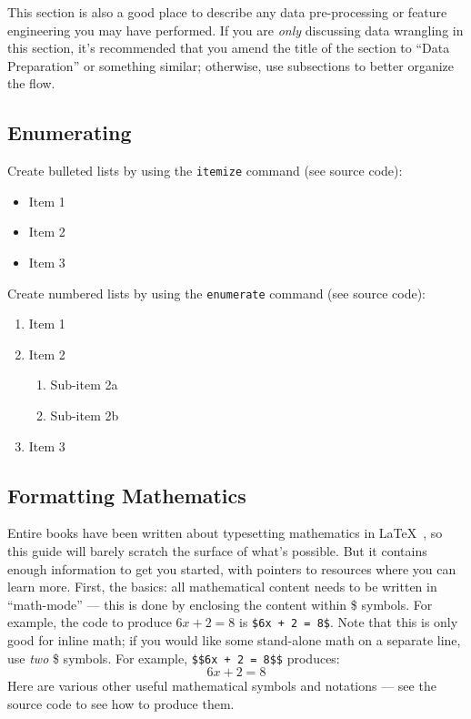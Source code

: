 This section is also a good place to describe any data pre-processing
or feature engineering you may have performed. If you are \emph{only}
discussing data wrangling in this section, it's recommended that you
amend the title of the section to ``Data Preparation'' or something
similar; otherwise, use subsections to better organize the flow.

\subsection{Enumerating}
\label{subsec:enum}

Create bulleted lists by using the \texttt{itemize} command (see source code):
\begin{itemize}
  \item Item 1
  \item Item 2
  \item Item 3
\end{itemize}
Create numbered lists by using the \texttt{enumerate} command (see source code):
\begin{enumerate}
  \item Item 1
  \item Item 2
    \begin{enumerate}
    \item Sub-item 2a
    \item Sub-item 2b
    \end{enumerate}
  \item Item 3
\end{enumerate}

\subsection{Formatting Mathematics}
\label{subsec:math}

Entire books have been written about typesetting mathematics in
\LaTeX~, so this guide will barely scratch the surface of what's
possible. But it contains enough information to get you started, with
pointers to resources where you can learn more. First, the basics: all
mathematical content needs to be written in ``math-mode'' --- this is
done by enclosing the content within \$ symbols. For example, the code
to produce $6x + 2 = 8$ is \texttt{\$6x + 2 = 8\$}. Note that this is
only good for inline math; if you would like some stand-alone math on
a separate line, use \emph{two} \$ symbols. For example,
\texttt{\$\$6x + 2 = 8\$\$} produces: $$6x+2 = 8$$ Here are various
other useful mathematical symbols and notations --- see the source
code to see how to produce them.

